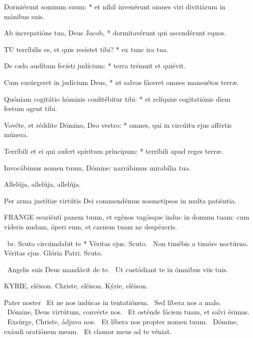 Dormiérunt somnum suum: * et nihil invenérunt omnes viri divitiárum in mánibus suis.

Ab increpatióne tua, Deus Jacob, * dormitavérunt qui ascendérunt equos.


\lettrine[lines=2]{T}{U} terríbilis es, et quis resístet tibi? * ex tunc ira tua.

De cælo audítum fecísti judícium: * terra trémuit et quiévit.

Cum exsúrgeret in judícium Deus, * ut salvos fáceret omnes mansuétos terræ.

Quóniam cogitátio hóminis confitébitur tibi: * et relíquiæ cogitatiónis diem festum agent tibi.

Vovéte, et réddite Dómino, Deo vestro: * omnes, qui in circúitu ejus affértis múnera.

Terríbili et ei qui aufert spíritum príncipum: * terríbili apud reges terræ.

  Invocábimus nomen tuum, Dómine: narrábimus mirabília tua.

  Allelúja, allelúja, allelúja.



 Per arma justítiæ virtútis Dei commendémus nosmetípsos in multa patiéntia.


\lettrine[lines=2]{F}{RANGE} esuriénti panem tuum, et egénos vagósque induc in domum tuam: cum víderis nudum, óperi eum, et carnem tuam ne despéxeris.

\R\ br. Scuto circúmdabit te * Véritas ejus. Scuto. \V\ Non timébis a timóre noctúrno. Véritas ejus. Glória Patri. Scuto.

\V\ Angelis suis Deus mandávit de te. \R\ Ut custódiant te in ómnibus viis tuis.


KYRIE, eléison. Christe, eléison. Kýrie, eléison.

Pater noster  \V\ Et ne nos indúcas in tentatiónem. \R\ Sed líbera nos a malo. \V\ Dómine, Deus virtútum, convérte nos. \R\ Et osténde fáciem tuam, et salvi érimus. \V\ Exsúrge, Christe, ádjuva nos. \R\ Et líbera nos propter nomen tuum. \V\ Dómine, exáudi oratiónem meam. \R\ Et clamor meus ad te véniat.

